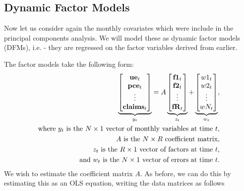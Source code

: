 \documentclass[11pt, letterpaper]{article}
\newcommand{\vv}[1]{\textcolor{black}{\mathbf{#1}}}
\begin{document}
\subsection{Dynamic Factor Models}
Now let us consider again the monthly covariates which were include in the principal components analysis. We will model these as dynamic factor models (DFMs), i.e. - they are regressed on the factor variables derived from earlier.

The factor models take the following form:
\begin{align*}
\underbrace{\begin{bmatrix}
	\vv{ue}_t\\
	\vv{pce}_t\\
	\vdots \\
	\vv{claims}_t
\end{bmatrix}}_{y_t}
=
A
\underbrace{\begin{bmatrix}
	\vv{f1}_{t}\\
	\vv{f2}_{t}\\
	\vdots \\
	\vv{fR}_{t}
\end{bmatrix}}_{z_t}
+
\underbrace{\begin{bmatrix}
	w1_t\\
	w2_t\\
	\vdots\\
	wN_t
\end{bmatrix}}_{w_t},\\
\text{where $y_t$ is the $N \times 1$ vector of monthly variables at time $t$,}\\
\text{$A$ is the $N \times R$ coefficient matrix,}\\
\text{$z_t$ is the $R \times 1$ vector of factors at time $t$,}\\
\text{and $w_t$ is the $N \times 1$ vector of errors at time $t$.}\\
\end{align*}
We wish to estimate the coefficient matrix $A$. As before, we can do this by estimating this as an OLS equation, writing the data matrices as follows
\end{document}
